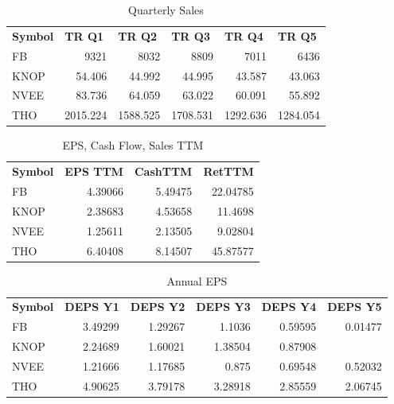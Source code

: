 \documentclass{article}
\begin{document}
\begin{table}[htbp]
  \caption{Quarterly Sales}
    \begin{tabular}{lrrrrr}
    \textbf{Symbol} & \multicolumn{1}{l}{\textbf{TR Q1}} & \multicolumn{1}{l}{\textbf{TR Q2}} & \multicolumn{1}{l}{\textbf{TR Q3}} & \multicolumn{1}{l}{\textbf{TR Q4}} & \multicolumn{1}{l}{\textbf{TR Q5}} \\
    FB    & 9321  & 8032  & 8809  & 7011  & 6436 \\
    KNOP  & 54.406 & 44.992 & 44.995 & 43.587 & 43.063 \\
    NVEE  & 83.736 & 64.059 & 63.022 & 60.091 & 55.892 \\
    THO   & 2015.224 & 1588.525 & 1708.531 & 1292.636 & 1284.054 \\
    \end{tabular}%
  \label{tab:addlabel}%
\end{table}%

\begin{table}[htbp]
  \caption{EPS, Cash Flow, Sales TTM}
    \begin{tabular}{lrrr}
    \textbf{Symbol} & \multicolumn{1}{l}{\textbf{EPS TTM}} & \multicolumn{1}{l}{\textbf{CashTTM}} & \multicolumn{1}{l}{\textbf{RetTTM}} \\
    FB    & 4.39066 & 5.49475 & 22.04785 \\
    KNOP  & 2.38683 & 4.53658 & 11.4698 \\
    NVEE  & 1.25611 & 2.13505 & 9.02804 \\
    THO   & 6.40408 & 8.14507 & 45.87577 \\
    \end{tabular}%
  \label{tab:addlabel}%
\end{table}%

\begin{table}[htbp]
  \caption{Annual EPS}
    \begin{tabular}{lrrrrr}
    \textbf{Symbol} & \multicolumn{1}{l}{\textbf{DEPS Y1}} & \multicolumn{1}{l}{\textbf{DEPS Y2}} & \multicolumn{1}{l}{\textbf{DEPS Y3}} & \multicolumn{1}{l}{\textbf{DEPS Y4}} & \multicolumn{1}{l}{\textbf{DEPS Y5}} \\
    FB    & 3.49299 & 1.29267 & 1.1036 & 0.59595 & 0.01477 \\
    KNOP  & 2.24689 & 1.60021 & 1.38504 & 0.87908 &  \\
    NVEE  & 1.21666 & 1.17685 & 0.875 & 0.69548 & 0.52032 \\
    THO   & 4.90625 & 3.79178 & 3.28918 & 2.85559 & 2.06745 \\
    \end{tabular}%
  \label{tab:addlabel}%
\end{table}%
\end{document}
